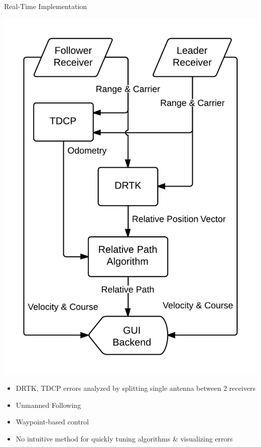 \documentclass{beamer}
\begin{document}
    \begin{frame}{Real-Time Implementation}
      \begin{minipage}{0.45\textwidth}
        \centering
        \includegraphics[width=\textwidth]{../graphics/data_algo.png}
      \end{minipage}
      \begin{minipage}{0.45\textwidth}
        \begin{itemize} \small
          \item DRTK, TDCP errors analyzed by splitting single antenna between 2 receivers
          \item Unmanned Following
          \item Waypoint-based control
          \item No intuitive method for quickly tuning algorithms \& visualizing errors
        \end{itemize}
      \end{minipage}
    \end{frame}
\end{document}
